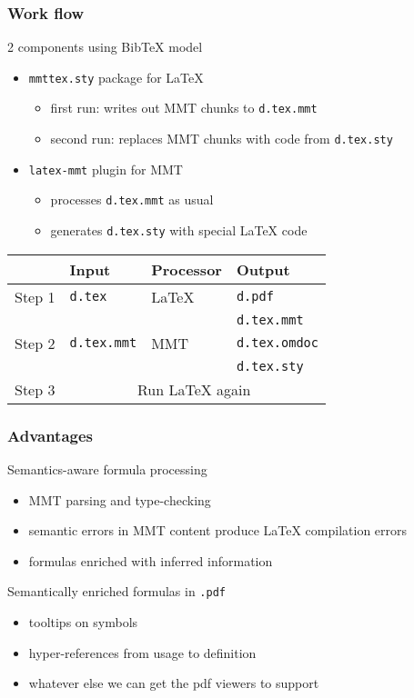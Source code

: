 \begin{frame}\frametitle{Work flow}
2 components using BibTeX model

\begin{itemize}
\item \texttt{mmttex.sty} package for LaTeX
 \begin{itemize}
 \item first run: writes out MMT chunks to \texttt{d.tex.mmt}
 \item second run: replaces MMT chunks with code from \texttt{d.tex.sty}
 \end{itemize}
\item \texttt{latex-mmt} plugin for MMT
 \begin{itemize}
 \item processes \texttt{d.tex.mmt} as usual
 \item generates \texttt{d.tex.sty} with special LaTeX code
 \end{itemize}
\end{itemize}

\begin{center}
\begin{tabular}{|l||l|l|l|}
\hline
& Input & Processor & Output \\
\hline
\hline
Step 1 & \texttt{d.tex} & LaTeX & \texttt{d.pdf} \\
       &                &       & \texttt{d.tex.mmt}\\
\hline
Step 2 & \texttt{d.tex.mmt} & MMT & \texttt{d.tex.omdoc} \\
       &                    &     & \texttt{d.tex.sty}\\
\hline
Step 3 & \multicolumn{3}{c|}{Run LaTeX again} \\
\hline
\end{tabular}
\end{center}
\end{frame}

\begin{frame}\frametitle{Advantages}
Semantics-aware formula processing
\begin{itemize}
\item MMT parsing and type-checking
\item semantic errors in MMT content produce LaTeX compilation errors
\item formulas enriched with inferred information
\end{itemize}

Semantically enriched formulas in \texttt{.pdf}
\begin{itemize}
\item tooltips on symbols
\item hyper-references from usage to definition
\item whatever else we can get the pdf viewers to support
\end{itemize}
\end{frame}


